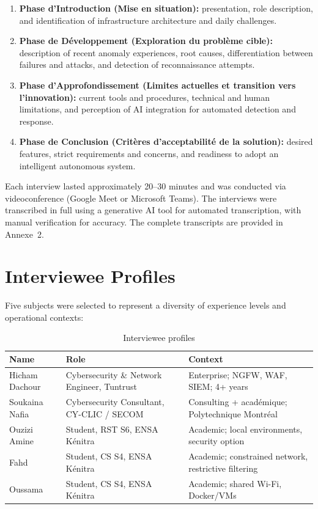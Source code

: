 \documentclass[12pt,a4paper]{report}
\begin{document}
\begin{enumerate}
    \item \textbf{Phase d'Introduction (Mise en situation):} presentation, role description, and identification of infrastructure architecture and daily challenges.
    \item \textbf{Phase de Développement (Exploration du problème cible):} description of recent anomaly experiences, root causes, differentiation between failures and attacks, and detection of reconnaissance attempts.
    \item \textbf{Phase d'Approfondissement (Limites actuelles et transition vers l'innovation):} current tools and procedures, technical and human limitations, and perception of AI integration for automated detection and response.
    \item \textbf{Phase de Conclusion (Critères d'acceptabilité de la solution):} desired features, strict requirements and concerns, and readiness to adopt an intelligent autonomous system.
\end{enumerate}

Each interview lasted approximately 20--30 minutes and was conducted via videoconference (Google Meet or Microsoft Teams). The interviews were transcribed in full using a generative AI tool for automated transcription, with manual verification for accuracy. The complete transcripts are provided in Annexe~2.

\section{Interviewee Profiles}

Five subjects were selected to represent a diversity of experience levels and operational contexts:

\begin{table}[H]
\centering
\caption{Interviewee profiles}
\label{tab:interviewees}
\begin{tabularx}{\textwidth}{l p{3cm} X}
\toprule
\textbf{Name} & \textbf{Role} & \textbf{Context} \\
\midrule
Hicham Dachour & Cybersecurity \& Network Engineer, Tuntrust & Enterprise; NGFW, WAF, SIEM; 4+ years \\
Soukaina Nafia & Cybersecurity Consultant, CY-CLIC / SECOM & Consulting + académique; Polytechnique Montréal \\
Ouzizi Amine & Student, RST S6, ENSA Kénitra & Academic; local environments, security option \\
Fahd & Student, CS S4, ENSA Kénitra & Academic; constrained network, restrictive filtering \\
Oussama & Student, CS S4, ENSA Kénitra & Academic; shared Wi-Fi, Docker/VMs \\
\bottomrule
\end{tabularx}
\end{table}
\end{document}

